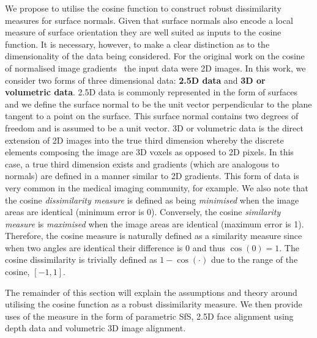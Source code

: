 We propose to utilise the cosine function to construct robust dissimilarity
measures for surface normals. Given that surface normals also encode a local
measure of surface orientation they are well suited as inputs to the cosine
function. It is necessary, however, to make a clear distinction as to the
dimensionality of the data being considered. For the original work
on the cosine of normalised image gradients~\cite{tzimiropoulos2012subspace}
the input data were 2D images. In this work, we consider two forms of three
dimensional data: \textbf{2.5D data} and \textbf{3D or volumetric data}.
2.5D data is commonly represented in the form of surfaces and we define
the surface normal to be the unit vector perpendicular to the plane
tangent to a point on the surface. This surface normal contains
two degrees of freedom and is assumed to be a unit vector. 3D or volumetric
data is the direct extension of 2D images into the true third dimension
whereby the discrete elements composing the image are 3D voxels as opposed to
2D pixels. In this case, a true third dimension exists and gradients (which
are analogous to normals) are defined in a manner similar to 2D gradients. This
form of data is very common in the medical imaging community, for example.
We also note that the cosine \textit{dissimilarity measure} is defined as being
\textit{minimised} when the image areas are identical (minimum error is 0).
Conversely, the cosine \textit{similarity measure} is \textit{maximised} when
the image  areas are identical (maximum error is 1). Therefore, the
cosine measure is naturally defined as a similarity measure since when
two angles are identical their difference is 0 and thus $\cos(0) = 1$. The
cosine dissimilarity is trivially defined as $1 - \cos(\cdot)$ due to the range
of the cosine, $[-1, 1]$.

The remainder of this section will explain the assumptions and theory around
utilising the cosine function as a robust dissimilarity measure. We then
provide uses of the measure in the form of parametric SfS, 2.5D face
alignment using depth data and volumetric 3D image alignment.
